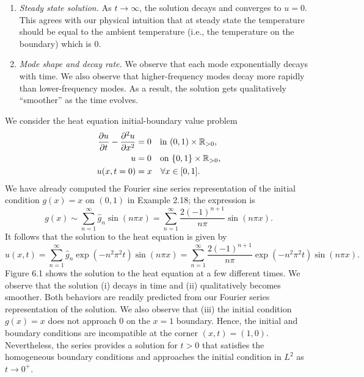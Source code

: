 \begin{enumerate}
    \item \textit{Steady state solution.} As $t \to \infty$, the solution decays and converges to $u = 0$. This agrees with our physical intuition that at steady state the temperature should be equal to the ambient temperature (i.e., the temperature on the boundary) which is $0$.
    \item \textit{Mode shape and decay rate.} We observe that each mode exponentially decays with time. We also observe that higher-frequency modes decay more rapidly than lower-frequency modes. As a result, the solution gets qualitatively ``smoother'' as the time evolves.
\end{enumerate}

\begin{example}
    We consider the heat equation initial-boundary value problem
    \begin{align*}
        \frac{\partial u}{\partial t} - \frac{\partial^2 u}{\partial x^2} &= 0 \quad \text{in } (0, 1) \times \mathbb{R}_{>0}, \\
        u &= 0 \quad \text{on } \{0, 1\} \times \mathbb{R}_{>0}, \\
        u(x, t = 0) &= x \quad \forall x \in [0, 1].
    \end{align*}
    We have already computed the Fourier sine series representation of the initial condition $g(x) = x$ on $(0, 1)$ in Example 2.18; the expression is
    \[g(x) \sim \sum_{n=1}^{\infty} \hat{g}_n \sin(n\pi x) = \sum_{n=1}^{\infty} \frac{2(-1)^{n+1}}{n\pi} \sin(n\pi x).\]
    It follows that the solution to the heat equation is given by
    \[u(x, t) = \sum_{n=1}^{\infty} \hat{g}_n \exp(-n^2\pi^2 t) \sin(n\pi x) = \sum_{n=1}^{\infty} \frac{2(-1)^{n+1}}{n\pi} \exp(-n^2\pi^2 t) \sin(n\pi x).\]
    Figure 6.1 shows the solution to the heat equation at a few different times. We observe that the solution (i) decays in time and (ii) qualitatively becomes smoother. Both behaviors are readily predicted from our Fourier series representation of the solution. We also observe that (iii) the initial condition $g(x) = x$ does not approach $0$ on the $x = 1$ boundary. Hence, the initial and boundary conditions are incompatible at the corner $(x, t) = (1, 0)$. Nevertheless, the series provides a solution for $t > 0$ that satisfies the homogeneous boundary conditions and approaches the initial condition in $L^2$ as $t \to 0^+$.
\end{example}


